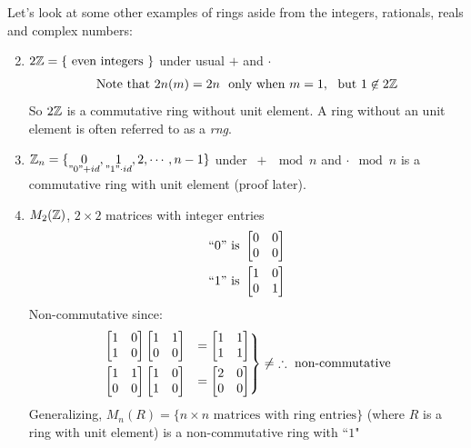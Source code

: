 \noindent Let's look at some other examples of rings aside from the integers, rationals, reals and
complex numbers:
\begin{enumerate}\setcounter{enumi}{1}
    \item $2{\mathbb{Z}}=\{\text{ even integers }\}$ under usual $+$ and $\cdot$ \ \ \\
    \begin{align}
        \text{Note that } 2n(m)=2n  \ \text{ only when }m=1, \ \text{ but } 1\not\in 2{\mathbb{Z}} \nonumber
    \end{align}
    So $2{\mathbb{Z}}$ is a commutative ring without unit element. A ring without an unit element is often
    referred to as a \textit{rng}.
    \item ${\mathbb{Z}}_n=\{\underset{"0" + id}{0},\underset{"1" \cdot id}{1},2,\cdots,n-1\}$ under
    $\ +\mod n$ and $\cdot \mod n$ is a commutative ring with unit element (proof later).
    \item $M_2({\mathbb{Z}})$, $2\times 2$ matrices with integer entries
    \begin{align}
        ``0" \text{ is }\begin{bmatrix}0&0\\0&0\end{bmatrix} \nonumber \\
        ``1" \text{ is }\begin{bmatrix}1&0\\0&1\end{bmatrix} \nonumber
    \end{align}
    Non-commutative since:
    \begin{equation*}
        \begin{drcases}
            \begin{bmatrix}
                    1&0\\1&0
            \end{bmatrix}
            \begin{bmatrix}
                    1&1\\0&0
            \end{bmatrix} &= \begin{bmatrix}
                    1&1\\1&1
            \end{bmatrix} \\
            \begin{bmatrix}
                    1&1\\0&0
            \end{bmatrix}\begin{bmatrix}
                    1&0\\1&0
            \end{bmatrix} &= \begin{bmatrix}
                    2&0\\0&0
            \end{bmatrix}
        \end{drcases} \neq \ \therefore \text{ non-commutative}
    \end{equation*}
    Generalizing, $M_n(R)=\{n\times n \text{ matrices with ring entries}\}$ (where $R$ is a ring
    with unit element) is a non-commutative ring with ``$1$"
\end{enumerate}

